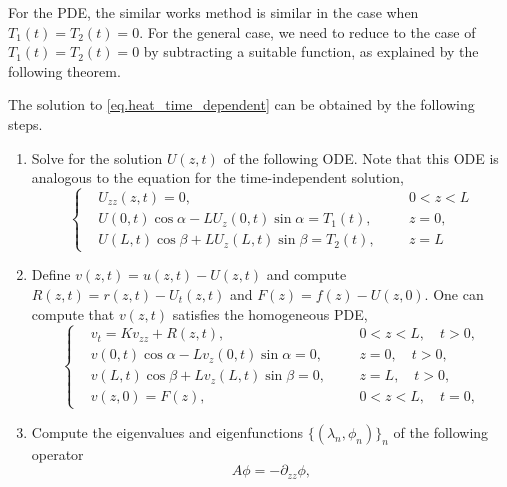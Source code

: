 For the PDE, the similar works method is similar in the case when $T_1(t) = T_2(t) = 0$. For the general case, we need to reduce to the case of $T_1(t) = T_2(t) = 0$ by subtracting a suitable function, as explained by the following theorem.
\begin{theorem}\label{th.solve_time_dependent_heat}
    The solution to \eqref{eq.heat_time_dependent} can be obtained by the following steps.
    \begin{enumerate}
        \item Solve for the solution $U(z, t)$ of the following ODE. Note that this ODE is analogous to the equation for the time-independent solution, 
        \begin{equation}\label{eq.reducing_boundary}
        \left\{\begin{aligned} 
            &U_{z z}(z, t) = 0, && 0<z<L
            \\ 
            &U(0, t) \cos \alpha-L U_z(0, t) \sin \alpha=T_1(t),\quad && z=0, 
            \\ 
            &U(L, t) \cos \beta+L U_z(L, t) \sin \beta=T_2(t), && z=L
        \end{aligned}\right.
    \end{equation}
    \item Define $v(z, t) = u(z, t) - U(z, t)$ and compute $R(z, t) = r(z, t)-U_t(z, t)$ and $F(z) = f(z)-U(z, 0)$. One can compute that $v(z, t)$ satisfies the homogeneous PDE,
    \begin{equation}\label{eq.heat_time_dependent_homogeneized}
        \left\{\begin{aligned} 
            &v_t=K v_{z z} + R(z, t), && 0<z<L, \quad t>0, 
            \\ 
            &v(0, t) \cos \alpha-L v_z(0, t) \sin \alpha=0,\quad && z=0, \quad t>0, 
            \\ 
            &v(L, t) \cos \beta+L v_z(L, t) \sin \beta=0, && z=L, \quad t>0, 
            \\
            &v(z, 0)=F(z), && 0<z<L, \quad t=0,
        \end{aligned}\right.
    \end{equation}
    \item Compute the eigenvalues and eigenfunctions $\{(\lambda_n, \phi_n)\}_n$ of the following operator
    \begin{equation}
        A \phi = - \partial_{zz}\phi,
    \end{equation}
    \begin{equation}

\end{equation}
\end{enumerate}
\end{theorem}
